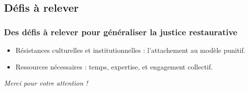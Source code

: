 \documentclass[french]{beamer}
\begin{document}
\subsection{Défis à relever}
\begin{frame}
  \frametitle{Des défis à relever pour généraliser la justice restaurative}
  \begin{itemize}
    \item Résistances culturelles et institutionnelles : l’attachement au modèle punitif.
    \item Ressources nécessaires : temps, expertise, et engagement collectif.
  \end{itemize}
\end{frame}

\begin{frame}[plain]
  \addtocounter{framenumber}{-1}
  \begin{center}
    \huge
    \textit{Merci pour votre attention !}
  \end{center}
\end{frame}
\end{document}

